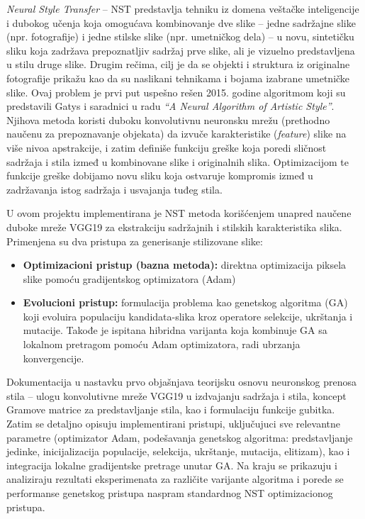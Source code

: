\documentclass[a4paper,12pt]{article}
\begin{document}
\emph{Neural Style Transfer} -- NST predstavlja tehniku iz domena veštačke inteligencije i dubokog učenja koja omogućava kombinovanje dve slike -- jedne sadržajne slike (npr. fotografije) i jedne stilske slike (npr. umetničkog dela) -- u novu, sintetičku sliku koja zadržava prepoznatljiv sadržaj prve slike, ali je vizuelno predstavljena u stilu druge slike. Drugim rečima, cilj je da se objekti i struktura iz originalne fotografije prikažu kao da su naslikani tehnikama i bojama izabrane umetničke slike. Ovaj problem je prvi put uspešno rešen 2015. godine algoritmom koji su predstavili Gatys i saradnici u radu \emph{“A Neural Algorithm of Artistic Style”}. Njihova metoda koristi duboku konvolutivnu neuronsku mrežu (prethodno naučenu za prepoznavanje objekata) da izvuče karakteristike (\emph{feature}) slike na više nivoa apstrakcije, i zatim definiše funkciju greške koja poredi sličnost sadržaja i stila izmeđ u kombinovane slike i originalnih slika. Optimizacijom te funkcije greške dobijamo novu sliku koja ostvaruje kompromis izmeđ u zadržavanja istog sadržaja i usvajanja tuđeg stila.

U ovom projektu implementirana je NST metoda korišćenjem unapred naučene duboke mreže VGG19 za ekstrakciju sadržajnih i stilskih karakteristika slika. Primenjena su dva pristupa za generisanje stilizovane slike:
\begin{itemize}
\item \textbf{Optimizacioni pristup (bazna metoda):} direktna optimizacija piksela slike pomoću gradijentskog optimizatora (Adam)
\item \textbf{Evolucioni pristup:} formulacija problema kao genetskog algoritma (GA) koji evoluira populaciju kandidata-slika kroz operatore selekcije, ukrštanja i mutacije. Takođe je ispitana hibridna varijanta koja kombinuje GA sa lokalnom pretragom pomoću Adam optimizatora, radi ubrzanja konvergencije.
\end{itemize}

Dokumentacija u nastavku prvo objašnjava teorijsku osnovu neuronskog prenosa stila -- ulogu konvolutivne mreže VGG19 u izdvajanju sadržaja i stila, koncept Gramove matrice za predstavljanje stila, kao i formulaciju funkcije gubitka. Zatim se detaljno opisuju implementirani pristupi, uključujuci sve relevantne parametre (optimizator Adam, podešavanja genetskog algoritma: predstavljanje jedinke, inicijalizacija populacije, selekcija, ukrštanje, mutacija, elitizam), kao i integracija lokalne gradijentske pretrage unutar GA. Na kraju se prikazuju i analiziraju rezultati eksperimenata za različite varijante algoritma i porede se performanse genetskog pristupa naspram standardnog NST optimizacionog pristupa.
\end{document}
